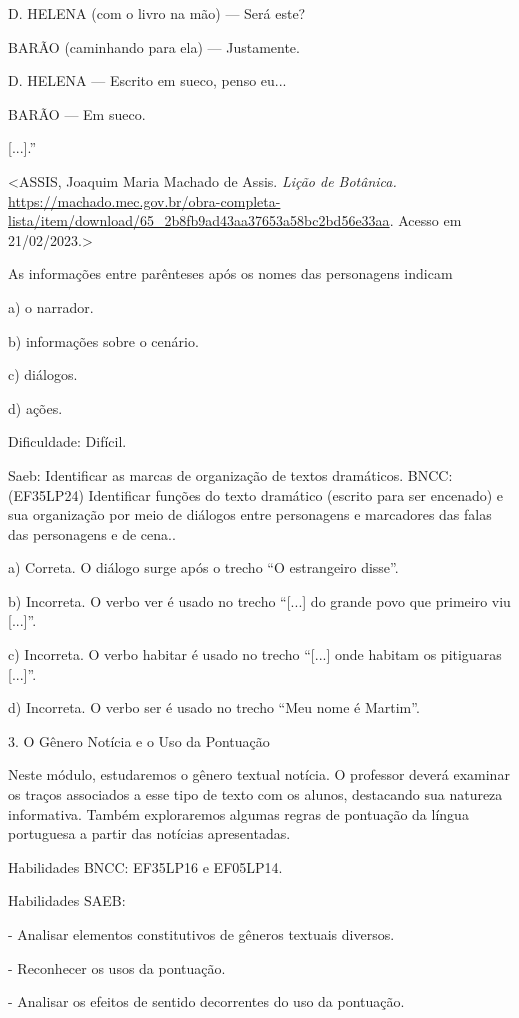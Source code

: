 D. HELENA (com o livro na mão) --- Será este?

BARÃO (caminhando para ela) --- Justamente.

D. HELENA --- Escrito em sueco, penso eu...

BARÃO --- Em sueco.

{[}...{]}.''

\textless{}ASSIS, Joaquim Maria Machado de Assis. \emph{Lição de
Botânica.}
\url{https://machado.mec.gov.br/obra-completa-lista/item/download/65_2b8fb9ad43aa37653a58bc2bd56e33aa}.
Acesso em 21/02/2023.\textgreater{}

As informações entre parênteses após os nomes das personagens indicam

a) o narrador.

b) informações sobre o cenário.

c) diálogos.

d) ações.

Dificuldade: Difícil.

Saeb: Identificar as marcas de organização de textos dramáticos. BNCC:
(EF35LP24) Identificar funções do texto dramático (escrito para ser
encenado) e sua organização por meio de diálogos entre personagens e
marcadores das falas das personagens e de cena..

a) Correta. O diálogo surge após o trecho ``O estrangeiro disse''.

b) Incorreta. O verbo ver é usado no trecho ``{[}...{]} do grande povo
que primeiro viu {[}...{]}''.

c) Incorreta. O verbo habitar é usado no trecho ``{[}...{]} onde habitam
os pitiguaras {[}...{]}''.

d) Incorreta. O verbo ser é usado no trecho ``Meu nome é Martim''.

3. O Gênero Notícia e o Uso da Pontuação

Neste módulo, estudaremos o gênero textual notícia. O professor deverá
examinar os traços associados a esse tipo de texto com os alunos,
destacando sua natureza informativa. Também exploraremos algumas regras
de pontuação da língua portuguesa a partir das notícias apresentadas.

Habilidades BNCC: EF35LP16 e EF05LP14.

Habilidades SAEB:

- Analisar elementos constitutivos de gêneros textuais diversos.

- Reconhecer os usos da pontuação.

- Analisar os efeitos de sentido decorrentes do uso da pontuação.

